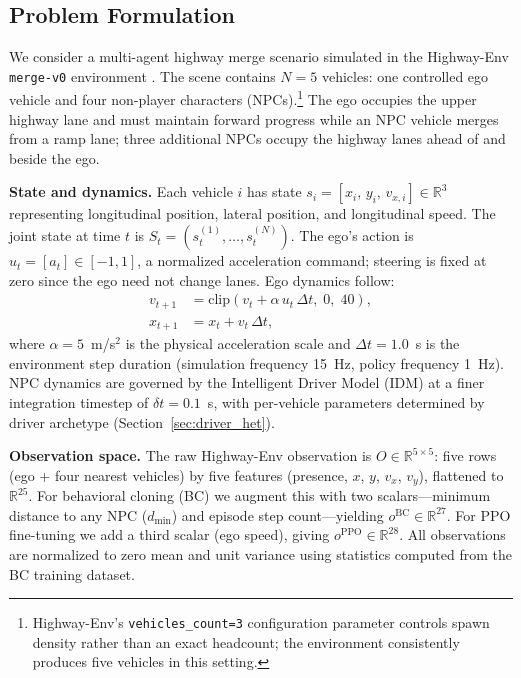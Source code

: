\documentclass[conference]{IEEEtran}
\begin{document}
\subsection{Problem Formulation}

We consider a multi-agent highway merge scenario simulated in the
Highway-Env \texttt{merge-v0} environment \cite{leurent2018highway}.
The scene contains $N = 5$ vehicles: one controlled ego vehicle and four
non-player characters (NPCs).\footnote{Highway-Env's
\texttt{vehicles\_count=3} configuration parameter controls spawn
density rather than an exact headcount; the environment consistently
produces five vehicles in this setting.}
The ego occupies the upper highway lane and must maintain forward progress
while an NPC vehicle merges from a ramp lane; three additional NPCs occupy
the highway lanes ahead of and beside the ego.

\textbf{State and dynamics.}
Each vehicle $i$ has state $s_i = [x_i,\, y_i,\, v_{x,i}] \in \mathbb{R}^3$
representing longitudinal position, lateral position, and longitudinal speed.
The joint state at time $t$ is $S_t = (s_t^{(1)}, \ldots, s_t^{(N)})$.
The ego's action is $u_t = [a_t] \in [-1, 1]$, a normalized acceleration
command; steering is fixed at zero since the ego need not change lanes.
Ego dynamics follow:
\begin{align}
  v_{t+1} &= \text{clip}(v_t + \alpha\, u_t\, \Delta t,\; 0,\; 40), \label{eq:ego_v} \\
  x_{t+1} &= x_t + v_t\, \Delta t, \label{eq:ego_x}
\end{align}
where $\alpha = 5$~m/s$^2$ is the physical acceleration scale and
$\Delta t = 1.0$~s is the environment step duration (simulation frequency
15~Hz, policy frequency 1~Hz).
NPC dynamics are governed by the Intelligent Driver Model (IDM)
\cite{treiber2000congested} at a finer integration timestep of $\delta t = 0.1$~s,
with per-vehicle parameters determined by driver archetype (Section~\ref{sec:driver_het}).

\textbf{Observation space.}
The raw Highway-Env observation is $O \in \mathbb{R}^{5 \times 5}$:
five rows (ego $+$ four nearest vehicles) by five features
(presence, $x$, $y$, $v_x$, $v_y$), flattened to $\mathbb{R}^{25}$.
For behavioral cloning (BC) we augment this with two scalars---minimum
distance to any NPC ($d_{\min}$) and episode step count---yielding
$o^{\text{BC}} \in \mathbb{R}^{27}$.
For PPO fine-tuning we add a third scalar (ego speed), giving
$o^{\text{PPO}} \in \mathbb{R}^{28}$.
All observations are normalized to zero mean and unit variance using
statistics computed from the BC training dataset.
\end{document}

